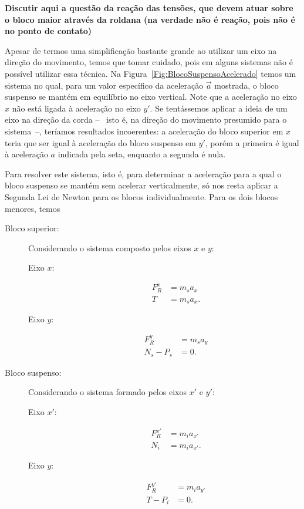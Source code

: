 \textbf{Discutir aqui a questão da reação das tensões, que devem atuar sobre o bloco maior através da roldana (na verdade não é reação, pois não é no ponto de contato)}

Apesar de termos uma simplificação bastante grande ao utilizar um eixo na direção do movimento, temos que tomar cuidado, pois em alguns sistemas não é possível utilizar essa técnica. Na Figura~\ref{Fig:BlocoSuspensoAcelerado} temos um sistema no qual, para um valor específico da aceleração $\vec{a}$ mostrada, o bloco suspenso se mantém em equilíbrio no eixo vertical. Note que a aceleração no eixo $x$ não está ligada à aceleração no eixo $y'$. Se tentássemos aplicar a ideia de um eixo na direção da corda --~ isto é, na direção do movimento presumido para o sistema~--, teríamos resultados incoerentes: a aceleração do bloco superior em $x$ teria que ser igual à aceleração do bloco suspenso em $y'$, porém a primeira é igual à aceleração $a$ indicada pela seta, enquanto a segunda é nula.

Para resolver este sistema, isto é, para determinar a aceleração para a qual o bloco suspenso se mantém sem acelerar verticalmente, só nos resta aplicar a Segunda Lei de Newton para os blocos individualmente. Para os dois blocos menores, temos
\begin{description}
    \item[Bloco superior:] Considerando o sistema composto pelos eixos $x$ e $y$:
        \begin{description}
            \item[Eixo $x$:]
                \begin{align}
                    F_R^x &= m_s a_x \\
                    T &= m_s a_x.
                \end{align}
            \item[Eixo $y$:]
                \begin{align}
                    F_R^y &= m_s a_y \\
                    N_s - P_s &= 0.
                \end{align}
        \end{description}
    \item[Bloco suspenso:] Considerando o sistema formado pelos eixos $x'$ e $y'$:
        \begin{description}
            \item[Eixo $x'$:]
                \begin{align}
                    F_R^{x'} &= m_i a_{x'} \\
                    N_i &= m_i a_{x'}.
                \end{align}
            \item[Eixo $y$:]
                \begin{align}
                    F_R^{y'} &= m_i a_{y'} \\
                    T - P_i &= 0.
                \end{align}
        \end{description}
\end{description}

